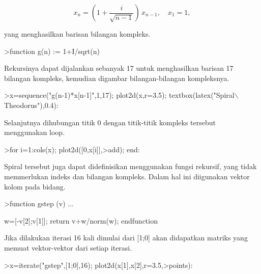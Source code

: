 \documentclass[a4paper,10pt]{article}
\begin{document}
\begin{eulernotebook}
\begin{eulercomment}
\begin{eulercomment}
\begin{eulercomment}
\begin{eulercomment}
\begin{eulercomment}
\begin{eulercomment}
\begin{eulercomment}
\begin{eulercomment}
\begin{eulercomment}
\begin{eulercomment}
\begin{eulercomment}
\begin{eulercomment}
\begin{eulercomment}
\begin{eulercomment}
\begin{eulercomment}
\end{eulercomment}
\begin{eulerformula}
\[
x_n = \left( 1 + \frac{i}{\sqrt{n-1}} \right) \, x_{n-1}, \quad x_1=1,
\]
\end{eulerformula}
\begin{eulercomment}
yang menghasilkan barisan bilangan kompleks.
\end{eulercomment}
\begin{eulerprompt}
>function g(n) := 1+I/sqrt(n)
\end{eulerprompt}
\begin{eulercomment}
Rekursinya dapat dijalankan sebanyak 17 untuk menghasilkan barisan 17
bilangan kompleks, kemudian digambar bilangan-bilangan kompleksnya.
\end{eulercomment}
\begin{eulerprompt}
>x=sequence("g(n-1)*x[n-1]",1,17); plot2d(x,r=3.5); textbox(latex("Spiral\(\backslash\) Theodorus"),0.4):
\end{eulerprompt}
\begin{eulercomment}
Selanjutnya dihubungan titik 0 dengan titik-titik kompleks tersebut
menggunakan loop.
\end{eulercomment}
\begin{eulerprompt}
>for i=1:cols(x); plot2d([0,x[i]],>add); end:
\end{eulerprompt}
\begin{eulercomment}
Spiral tersebut juga dapat didefinisikan menggunakan fungsi rekursif,
yang tidak memmerlukan indeks dan bilangan kompleks. Dalam hal ini
diigunakan vektor kolom pada bidang.
\end{eulercomment}
\begin{eulerprompt}
>function gstep (v) ...
\end{eulerprompt}
\begin{eulerudf}
  w=[-v[2];v[1]];
  return v+w/norm(w);
  endfunction
\end{eulerudf}
\begin{eulercomment}
Jika dilakukan iterasi 16 kali dimulai dari [1;0] akan didapatkan
matriks yang memuat vektor-vektor dari setiap iterasi.
\end{eulercomment}
\begin{eulerprompt}
>x=iterate("gstep",[1;0],16); plot2d(x[1],x[2],r=3.5,>points):
\end{eulerprompt}
\begin{eulercomment}
\begin{eulercomment}
\begin{eulercomment}

\end{eulercomment}
\end{eulercomment}
\end{eulercomment}
\end{eulercomment}
\end{eulercomment}
\end{eulercomment}
\end{eulercomment}
\end{eulercomment}
\end{eulercomment}
\end{eulercomment}
\end{eulercomment}
\end{eulercomment}
\end{eulercomment}
\end{eulercomment}
\end{eulercomment}
\end{eulercomment}
\end{eulercomment}
\end{eulernotebook}
\end{document}
